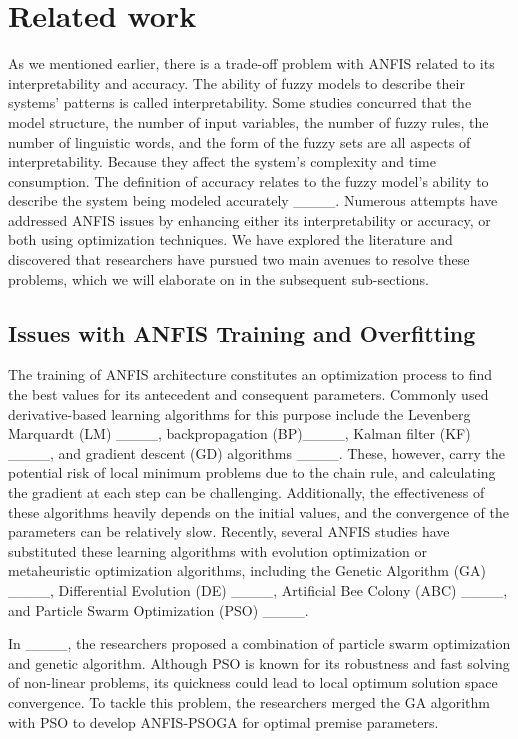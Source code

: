 \section{Related work}
\label{related2}
As we mentioned earlier, there is a trade-off problem with ANFIS related to its interpretability and accuracy. The ability of fuzzy models to describe their systems' patterns is called interpretability. Some studies concurred that the model structure, the number of input variables, the number of fuzzy rules, the number of linguistic words, and the form of the fuzzy sets are all aspects of interpretability. Because they affect the system's complexity and time consumption. The definition of accuracy relates to the fuzzy model's ability to describe the system being modeled accurately ____. Numerous attempts have addressed ANFIS issues by enhancing either its interpretability or accuracy, or both using optimization techniques. We have explored the literature and discovered that researchers have pursued two main avenues to resolve these problems, which we will elaborate on in the subsequent sub-sections.
\subsection{Issues with ANFIS Training and Overfitting}
The training of ANFIS architecture constitutes an optimization process to find the best values for its antecedent and consequent parameters. Commonly used derivative-based learning algorithms for this purpose include the Levenberg Marquardt (LM) ____, backpropagation (BP)____, Kalman filter (KF) ____, and gradient descent (GD) algorithms ____. These, however, carry the potential risk of local minimum problems due to the chain rule, and calculating the gradient at each step can be challenging. Additionally, the effectiveness of these algorithms heavily depends on the initial values, and the convergence of the parameters can be relatively slow. Recently, several ANFIS studies have substituted these learning algorithms with evolution optimization or metaheuristic optimization algorithms, including the Genetic Algorithm (GA) ____, Differential Evolution (DE) ____, Artificial Bee Colony (ABC) ____, and Particle Swarm Optimization (PSO) ____.

In ____, the researchers proposed a combination of particle swarm optimization and genetic algorithm. Although PSO is known for its robustness and fast solving of non-linear problems, its quickness could lead to local optimum solution space convergence. To tackle this problem, the researchers merged the GA algorithm with PSO to develop ANFIS-PSOGA for optimal premise parameters.

